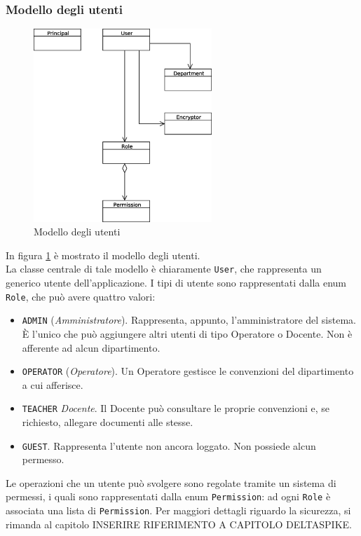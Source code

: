 \subsubsection{Modello degli utenti}

\begin{figure}[h]
	\centering
	\includegraphics[width=0.6\textwidth]{user_model.eps}
	\caption{Modello degli utenti}
	\label{user_model}
\end{figure}

In figura \ref{user_model} è mostrato il modello degli utenti. \\
La classe centrale di tale modello è chiaramente \texttt{User}, che rappresenta un generico utente dell'applicazione. I tipi di utente sono rappresentati dalla enum \texttt{Role}, che può avere quattro valori:

\begin{itemize}
\item \texttt{ADMIN} (\textsl{Amministratore}). Rappresenta, appunto, l'amministratore del sistema. È l'unico che può aggiungere altri utenti di tipo Operatore o Docente. Non è afferente ad alcun dipartimento.
\item \texttt{OPERATOR} (\textsl{Operatore}). Un Operatore gestisce le convenzioni del dipartimento a cui afferisce.
\item \texttt{TEACHER} \textsl{Docente}. Il Docente può consultare le proprie convenzioni e, se richiesto, allegare documenti alle stesse.
\item \texttt{GUEST}. Rappresenta l'utente non ancora loggato. Non possiede alcun permesso.
\end{itemize}

Le operazioni che un utente può svolgere sono regolate tramite un sistema di permessi, i quali sono rappresentati dalla enum \texttt{Permission}: ad ogni \texttt{Role} è associata una lista di \texttt{Permission}. Per maggiori dettagli riguardo la sicurezza, si rimanda al capitolo INSERIRE RIFERIMENTO A CAPITOLO DELTASPIKE.\\

